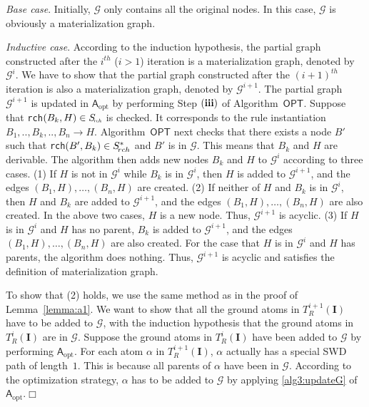 \emph{Base case}. Initially, $\mathcal{G}$ only contains all the original nodes.
In this case, $\mathcal{G}$ is obviously a materialization graph.

\emph{Inductive case}.
According to the induction hypothesis, the partial graph constructed after
the $i^{th}$ ($i>1$) iteration is a materialization graph, denoted by $\mathcal{G}^{i}$.
We have to show that the partial graph constructed after the $(i+1)^{th}$ iteration is
also a materialization graph, denoted by $\mathcal{G}^{i+1}$.
The partial graph $\mathcal{G}^{i+1}$ is updated in $\mathsf{A}_{\text{opt}}$ by performing Step $(\textbf{\romannumeral3})$
of Algorithm~$\mathsf{OPT}$.
Suppose that \texttt{rch}$(B_k,H)\in S_{\textit{\!\tiny rch}}$ is checked.
It corresponds to the rule instantiation $B_1,..,B_k,..,B_n\rightarrow H$.
Algorithm~$\mathsf{OPT}$ next checks that there exists a node $B'$ such that
\texttt{rch}$(B',B_k)\in S^*_{\!\tiny rch}$
and $B'$ is in $\mathcal{G}$. This means that $B_k$ and $H$ are derivable.
The algorithm then adds new nodes $B_k$ and $H$ to $\mathcal{G}^{i}$
according to three cases.
(1) If $H$ is not in $\mathcal{G}^{i}$ while $B_k$ is in $\mathcal{G}^{i}$,
then $H$ is added to $\mathcal{G}^{i+1}$, and the edges $(B_1, H),\ldots ,(B_n, H)$ are created.
(2) If neither of $H$ and $B_k$ is in $\mathcal{G}^{i}$,
then $H$ and $B_k$ are added to $\mathcal{G}^{i+1}$, and the edges $(B_1, H),\ldots ,(B_n, H)$ are also created.
In the above two cases, $H$ is a new node. Thus,
$\mathcal{G}^{i+1}$ is acyclic.
(3) If $H$ is in $\mathcal{G}^{i}$ and $H$ has no parent,
$B_k$ is added to $\mathcal{G}^{i+1}$, and the edges $(B_1, H),\ldots ,(B_n, H)$ are also created.
For the case that $H$ is in $\mathcal{G}^{i}$ and $H$ has parents,
the algorithm does nothing.
Thus, $\mathcal{G}^{i+1}$ is acyclic and satisfies the definition of materialization graph.

To show that (2) holds, we use the same method as in the proof of Lemma~\ref{lemma:a1}.
We want to show that all the ground atoms in $T_R^{i+1}(\textbf{I})$ have to be added to $\mathcal{G}$,
with the induction hypothesis that the ground atoms in $T_R^{i}(\textbf{I})$ are in $\mathcal{G}$.
Suppose the ground atoms in $T_R^{i}(\textbf{I})$ have been added to $\mathcal{G}$ by
performing $\mathsf{A}_{\text{opt}}$.
For each atom $\alpha$ in $T_R^{i+1}(\textbf{I})$, $\alpha$ actually has a special SWD path
of length~$1$. This is because all parents of $\alpha$ have been in $\mathcal{G}$.
According to the optimization strategy, $\alpha$ has to be added to $\mathcal{G}$ by applying \ref{alg3:updateG}
of $\mathsf{A}_{\text{opt}}$.\hfill$\Box$


